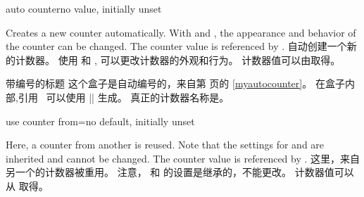 \begin{newTcbKey}{auto counter}{}{no value, initially unset}
\begin{stripedbox}
Creates a new counter automatically.%
With  and , 
the appearance and behavior of the counter can be changed. 
The counter value is referenced by .
\tcblower
自动创建一个新的计数器。%
使用  和 , %
可以更改计数器的外观和行为。%
计数器值可以由取得。
\end{stripedbox}



\begin{dispExample}
\begin{pabox}[label={myautocounter}]{带编号的标题}
这个盒子是自动编号的，来自第 \pageref{myautocounter} 页的 \ref{myautocounter}。%
在盒子内部,引用 \thetcbcounter\ 可以使用 |\thetcbcounter| 生成。
真正的计数器名称是\texttt{\tcbcounter}。
\end{pabox}
\end{dispExample}
\end{newTcbKey}


\begin{newTcbKey}{use counter from}{=}{no default, initially unset}
\begin{stripedbox}
Here, a counter from another  is reused.
Note that the settings for 
 and  
are inherited and cannot be changed.
The counter value is referenced by .
\tcblower
这里，来自另一个的计数器被重用。%
注意， 和  的设置是继承的，不能更改。%
计数器值可以从  取得。
\end{stripedbox}

\end{newTcbKey}

